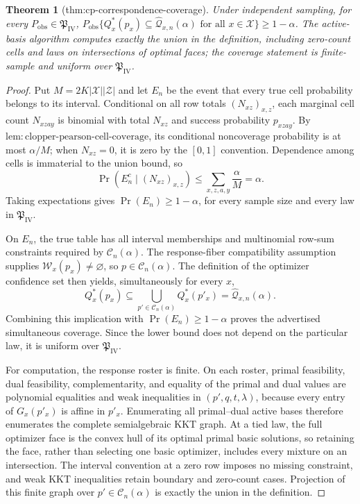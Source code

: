 \documentclass{article}
\newtheorem{theorem}{Theorem}
\begin{document}
\begin{theorem}[thm:cp-correspondence-coverage]\label{thm:cp-correspondence-coverage}
Under independent sampling, for every \(P_{\mathrm{obs}}\in\mathfrak P_{\mathrm{IV}}\), \(P_{\mathrm{obs}}\{Q_x^*(p_x)\subseteq\widehat{\mathcal Q}_{x,n}(\alpha)\text{ for all }x\in\mathcal X\}\geq1-\alpha\). The active-basis algorithm computes exactly the union in the definition, including zero-count cells and laws on intersections of optimal faces; the coverage statement is finite-sample and uniform over \(\mathfrak P_{\mathrm{IV}}\).
\end{theorem}
\begin{proof}
Put \(M=2K|\mathcal X||\mathcal Z|\) and let \(E_n\) be the event that every true cell probability belongs to its interval.  Conditional on all row totals \((N_{xz})_{x,z}\), each marginal cell count \(N_{xzay}\) is binomial with total \(N_{xz}\) and success probability \(p_{xzay}\).  By \(\mathrm{lem{:}clopper\text{-}pearson\text{-}cell\text{-}coverage}\), its conditional noncoverage probability is at most \(\alpha/M\); when \(N_{xz}=0\), it is zero by the \([0,1]\) convention.  Dependence among cells is immaterial to the union bound, so
\[
 \Pr(E_n^c\mid(N_{xz})_{x,z})
 \leq\sum_{x,z,a,y}\frac{\alpha}{M}=\alpha.
\]
Taking expectations gives \(\Pr(E_n)\geq1-\alpha\), for every sample size and every law in \(\mathfrak P_{\mathrm{IV}}\).

On \(E_n\), the true table has all interval memberships and multinomial row-sum constraints required by \(\mathcal C_n(\alpha)\).  The response-fiber compatibility assumption supplies \(\mathcal W_x(p_x)\neq\varnothing\), so \(p\in\mathcal C_n(\alpha)\).  The definition of the optimizer confidence set then yields, simultaneously for every \(x\),
\[
 Q_x^*(p_x)\subseteq\bigcup_{p'\in\mathcal C_n(\alpha)}Q_x^*(p'_x)
 =\widehat{\mathcal Q}_{x,n}(\alpha).
\]
Combining this implication with \(\Pr(E_n)\geq1-\alpha\) proves the advertised simultaneous coverage.  Since the lower bound does not depend on the particular law, it is uniform over \(\mathfrak P_{\mathrm{IV}}\).

For computation, the response roster is finite.  On each roster, primal feasibility, dual feasibility, complementarity, and equality of the primal and dual values are polynomial equalities and weak inequalities in \((p',q,t,\lambda)\), because every entry of \(G_x(p'_x)\) is affine in \(p'_x\).  Enumerating all primal--dual active bases therefore enumerates the complete semialgebraic KKT graph.  At a tied law, the full optimizer face is the convex hull of its optimal primal basic solutions, so retaining the face, rather than selecting one basic optimizer, includes every mixture on an intersection.  The interval convention at a zero row imposes no missing constraint, and weak KKT inequalities retain boundary and zero-count cases.  Projection of this finite graph over \(p'\in\mathcal C_n(\alpha)\) is exactly the union in the definition.
\end{proof}
\end{document}

